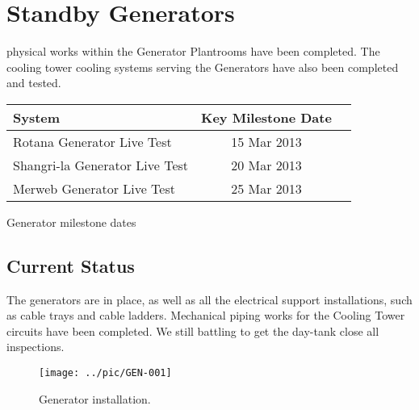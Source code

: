 


\chapter{Standby Generators }

 physical works within the Generator Plantrooms have been completed. The cooling tower cooling systems serving the Generators have also been completed and tested.

           \begin{margintable} 
	    \begin{tabular}{lcl}
	      \toprule
	      System    & Key Milestone Date  \\
	      \midrule
            Rotana Generator Live Test       &  15 Mar 2013  \\   
            Shangri-la Generator Live Test   & 20 Mar 2013\\
	       Merweb Generator Live Test       &  25 Mar 2013  \\
	      \bottomrule
	    \end{tabular}
           \caption{Generator milestone dates}
           \label{tbl:KEkeydates}
            \end{margintable}
 

\section{Current Status}

The generators are in place, as well as all the electrical support installations, such as cable trays and cable ladders. Mechanical piping works for the Cooling Tower circuits have been completed. We still
battling to get the day-tank close all inspections.


\begin{figure*}
  \texttt{[image: ../pic/GEN-001]}
  \caption{Generator installation.}
  \label{fig:generators}
\end{figure*}


